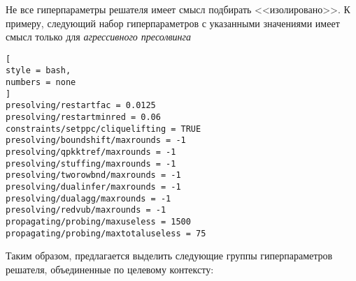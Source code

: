 \documentclass[%
	11pt,
	a4paper,
	utf8,
		]{article}
\begin{document}
Не все гиперпараметры решателя имеет смысл подбирать <<изолировано>>. К примеру, следующий набор гиперпараметров с указанными значениями имеет смысл только для \emph{агрессивного пресолвинга}
\begin{lstlisting}[
style = bash,
numbers = none
]
presolving/restartfac = 0.0125
presolving/restartminred = 0.06
constraints/setppc/cliquelifting = TRUE
presolving/boundshift/maxrounds = -1
presolving/qpkktref/maxrounds = -1
presolving/stuffing/maxrounds = -1
presolving/tworowbnd/maxrounds = -1
presolving/dualinfer/maxrounds = -1
presolving/dualagg/maxrounds = -1
presolving/redvub/maxrounds = -1
propagating/probing/maxuseless = 1500
propagating/probing/maxtotaluseless = 75
\end{lstlisting}

Таким образом, предлагается выделить следующие группы гиперпараметров решателя, объединенные по целевому контексту:
\end{document}
